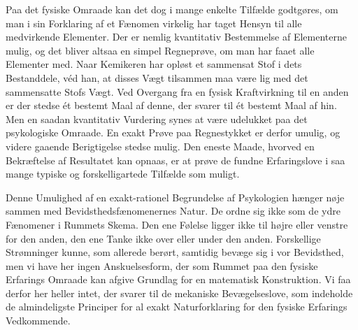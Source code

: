 \documentclass[12pt,a4paper,openany]{book}
\newcommand{\opage}[1]{\marginnote{\footnotesize\textit{[#1]}}}
\begin{document}
Paa det fysiske Omraade kan det dog i mange enkelte Tilfælde godtgøres,
om man i sin Forklaring af et Fænomen virkelig har taget Hensyn til alle
medvirkende Elementer. Der er nemlig kvantitativ Bestemmelse af
Elementerne mulig, og det bliver altsaa en simpel Regneprøve, om man har
faaet alle Elementer med. Naar Kemikeren har opløst et sammensat Stof i
dets Bestanddele, véd han, at disses Vægt tilsammen maa være lig med det
sammensatte Stofs Vægt. Ved Overgang fra en fysisk Kraftvirkning til en
anden er der stedse ét bestemt Maal af denne, der svarer til ét bestemt
Maal af
\opage{25}hin. Men en saadan kvantitativ Vurdering synes at være
udelukket paa det psykologiske Omraade. En exakt Prøve paa Regnestykket
er derfor umulig, og videre gaaende Berigtigelse stedse mulig. Den
eneste Maade, hvorved en Bekræftelse af Resultatet kan opnaas, er at
prøve de fundne Erfaringslove i saa mange typiske og forskelligartede
Tilfælde som muligt.

Denne Umulighed af en exakt-rationel Begrundelse af Psykologien hænger
nøje sammen med Bevidsthedsfænomenernes Natur. De ordne sig ikke som de
ydre Fænomener i Rummets Skema. Den ene Følelse ligger ikke til højre
eller venstre for den anden, den ene Tanke ikke over eller under den
anden. Forskellige Strømninger kunne, som allerede berørt, samtidig
bevæge sig i vor Bevidsthed, men vi have her ingen Anskuelsesform, der
som Rummet paa den fysiske Erfarings Omraade kan afgive Grundlag for en
matematisk Konstruktion. Vi faa derfor her heller intet, der svarer til
de mekaniske Bevægelseslove, som indeholde de almindeligste Principer
for al exakt Naturforklaring for den fysiske Erfarings Vedkommende.
\end{document}
